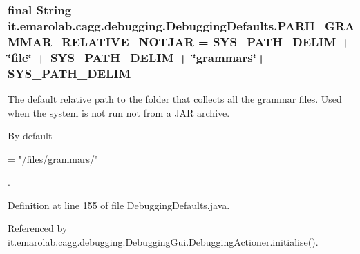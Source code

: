 \hypertarget{classit_1_1emarolab_1_1cagg_1_1debugging_1_1DebuggingDefaults_a325c9fa4713048139bba6cf3ec933424}{
\subsubsection[{P\-A\-R\-H\-\_\-\-G\-R\-A\-M\-M\-A\-R\-\_\-\-R\-E\-L\-A\-T\-I\-V\-E\-\_\-\-N\-O\-T\-J\-A\-R}]{\setlength{\rightskip}{0pt plus 5cm}final String it.\-emarolab.\-cagg.\-debugging.\-Debugging\-Defaults.\-P\-A\-R\-H\-\_\-\-G\-R\-A\-M\-M\-A\-R\-\_\-\-R\-E\-L\-A\-T\-I\-V\-E\-\_\-\-N\-O\-T\-J\-A\-R = {\bf S\-Y\-S\-\_\-\-P\-A\-T\-H\-\_\-\-D\-E\-L\-I\-M} + \char`\"{}file\char`\"{} + S\-Y\-S\-\_\-\-P\-A\-T\-H\-\_\-\-D\-E\-L\-I\-M + \char`\"{}grammars\char`\"{}+ S\-Y\-S\-\_\-\-P\-A\-T\-H\-\_\-\-D\-E\-L\-I\-M\hspace{0.3cm}{\ttfamily [static]}}}\label{classit_1_1emarolab_1_1cagg_1_1debugging_1_1DebuggingDefaults_a325c9fa4713048139bba6cf3ec933424}
The default relative path to the folder that collects all the grammar files. Used when the system is not run not from a J\-A\-R archive.\par
 By default
\begin{DoxyCode}
= \textcolor{stringliteral}{"/files/grammars/"} 
\end{DoxyCode}
 . 

Definition at line 155 of file Debugging\-Defaults.\-java.



Referenced by it.\-emarolab.\-cagg.\-debugging.\-Debugging\-Gui.\-Debugging\-Actioner.\-initialise().

